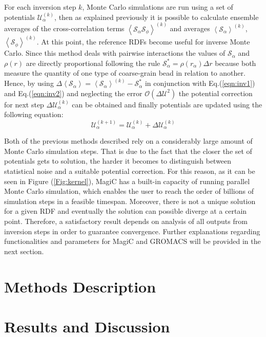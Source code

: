 \documentclass[10pt,a4paper,twoside]{article}
\begin{document}
For each inversion step $k$, Monte Carlo simulations are run using a set of potentials $\mathcal{U}_{\alpha}^{(k)}$, then as explained previously it is possible to calculate ensemble averages of the cross-correlation terms ${\left\langle\mathcal{S}_\alpha\mathcal{S}_\phi\right\rangle}^{(k)}$ and averages $\left\langle\mathcal{S}_\alpha\right\rangle^{(k)}$, $\left\langle\mathcal{S}_\phi\right\rangle^{(k)}$. At this point, the reference RDFs become useful for inverse Monte Carlo. Since this method deals with pairwise interactions the values of $\mathcal{S}_\alpha$ and $\rho(r)$ are directly proportional following the rule $\mathcal{S}_\alpha^{*}= \rho(r_\alpha)\Delta r $ \cite{magic} because both measure the quantity of one type of coarse-grain bead in relation to another. Hence, by using $\Delta\left\langle\mathcal{S}_\alpha\right\rangle = \left\langle\mathcal{S}_\alpha\right\rangle^{(k)} - \mathcal{S}_\alpha^{*}$  in conjunction with Eq.(\ref{eqn:inv1}) and Eq.(\ref{eqn:inv2}) and neglecting the error $\mathcal{O}({\Delta\mathcal{U}}^2)$ the potential correction for next step $\Delta\mathcal{U}_\alpha^{(k)}$ can be obtained and finally potentials are updated using the following  equation:
 \begin{equation}
\mathcal{U}_\alpha^{(k+1)}= \mathcal{U}_\alpha^{(k)}+\Delta\mathcal{U}_\alpha^{(k)}
\label{eqn:potup}
\end{equation} 

Both of the previous methods described rely on a considerably large amount of Monte Carlo simulation steps. That is due to the fact that the closer the set of potentials gets to solution, the harder it becomes to distinguish between statistical noise and a suitable potential correction. For this reason, as it can be seen in Figure (\ref{Fig:kernel}), MagiC has a built-in capacity of running parallel Monte Carlo simulation, which enables the user to reach the order of billions of simulation steps in a feasible timespan. Moreover, there is not a unique solution for a given RDF \cite{ibi} and eventually the solution can possible diverge at a certain point. Therefore, a satisfactory result depends on analysis of all outputs from inversion steps in order to guarantee convergence. Further explanations regarding functionalities and parameters for MagiC and GROMACS will be provided in the next section.  
\section{Methods Description} 
\section{Results and Discussion}
\end{document}
